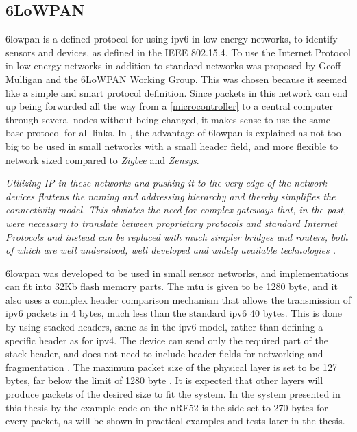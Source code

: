 
\subsection{6LoWPAN}

\noindent \gls{6lowpan} is a defined protocol for using \gls{ipv6} in low energy networks, to identify sensors and devices, as defined in the IEEE 802.15.4. To use the Internet Protocol in low energy networks in addition to standard networks was proposed by Geoff Mulligan and the 6LoWPAN Working Group. This was chosen because it seemed like a simple and smart protocol definition. Since packets in this network can end up being forwarded all the way from a \ref{microcontroller} to a central computer through several nodes without being changed, it makes sense to use the same base protocol for all links. In \cite{mulligan20076lowpan}, the advantage of \gls{6lowpan} is explained as not too big to be used in small networks with a small header field, and more flexible to network sized compared to \textit{Zigbee} and \textit{Zensys}. 

\noindent\textit{Utilizing IP  in these networks and pushing it to the very edge of the network devices flattens the naming and addressing hierarchy and  thereby  simplifies  the  connectivity  model. This obviates the need  for  complex  gateways  that,  in  the  past,  were  necessary  to translate   between   proprietary   protocols   and   standard   Internet Protocols and instead can be replaced with much simpler bridges and  routers,  both  of  which  are  well  understood, well  developed and  widely  available  technologies \cite{mulligan20076lowpan}.}


\noindent \gls{6lowpan} was developed to be used in small sensor networks, and implementations can fit into 32Kb flash memory parts. The \gls{mtu} is given to be 1280 byte, and it also uses a complex header comparison mechanism that allows the transmission of \gls{ipv6} packets in 4 bytes, much less than the standard \gls{ipv6} 40 bytes. This is done by using stacked headers, same as in the \gls{ipv6} model, rather than defining a specific header as for \gls{ipv4}. The device can send only the required part of the stack header, and does not need to include header fields for networking and fragmentation \cite{hui2008extending}. The maximum packet size of the physical layer is set to be 127 bytes, far below the limit of 1280 byte \cite{kushalnagar2007transmission}. It is expected that other layers will produce packets of the desired size to fit the system. In the system presented in this thesis by the example code on the nRF52 is the side set to 270 bytes for every packet, as will be shown in practical examples and tests later in the thesis. 
  

